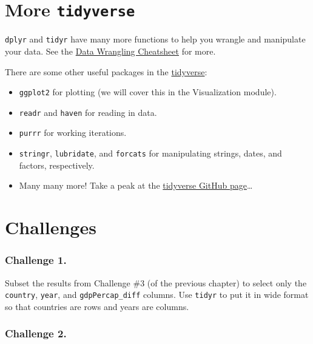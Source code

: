 \documentclass[
]{book}
\providecommand{\tightlist}{%
  \setlength{\itemsep}{0pt}\setlength{\parskip}{0pt}}
\begin{document}
\hypertarget{more-tidyverse}{%
\section{\texorpdfstring{More \texttt{tidyverse}}{More tidyverse}}\label{more-tidyverse}}

\texttt{dplyr} and \texttt{tidyr} have many more functions to help you wrangle and manipulate
your data. See the \href{https://www.rstudio.com/wp-content/uploads/2015/02/data-wrangling-cheatsheet.pdf}{Data Wrangling Cheatsheet} for more.

There are some other useful packages in the \href{http://www.tidyverse.org}{tidyverse}:

\begin{itemize}
\tightlist
\item
  \texttt{ggplot2} for plotting (we will cover this in the Visualization module).
\item
  \texttt{readr} and \texttt{haven} for reading in data.
\item
  \texttt{purrr} for working iterations.
\item
  \texttt{stringr}, \texttt{lubridate}, and \texttt{forcats} for manipulating strings, dates, and factors, respectively.
\item
  Many many more! Take a peak at the \href{https://github.com/tidyverse}{tidyverse GitHub page}\ldots{}
\end{itemize}

\hypertarget{challenges-7}{%
\section{Challenges}\label{challenges-7}}

\hypertarget{challenge-1.-4}{%
\subsubsection*{Challenge 1.}\label{challenge-1.-4}}

Subset the results from Challenge \#3 (of the previous chapter) to select only the \texttt{country}, \texttt{year}, and \texttt{gdpPercap\_diff} columns. Use \texttt{tidyr} to put it in wide format so that countries are rows and years are columns.

\hypertarget{challenge-2.-3}{%
\subsubsection*{Challenge 2.}\label{challenge-2.-3}}
\end{document}
